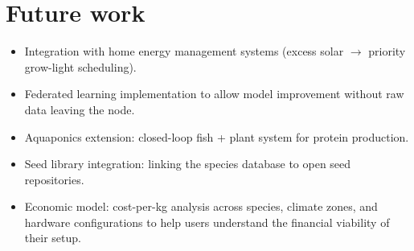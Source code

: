 \section{Future work}

\begin{itemize}
  \item Integration with home energy management systems (excess solar $\to$ priority grow-light scheduling).
  \item Federated learning implementation to allow model improvement without raw data leaving the node.
  \item Aquaponics extension: closed-loop fish + plant system for protein production.
  \item Seed library integration: linking the species database to open seed repositories.
  \item Economic model: cost-per-kg analysis across species, climate zones, and hardware configurations to help users understand the financial viability of their setup.
\end{itemize}
